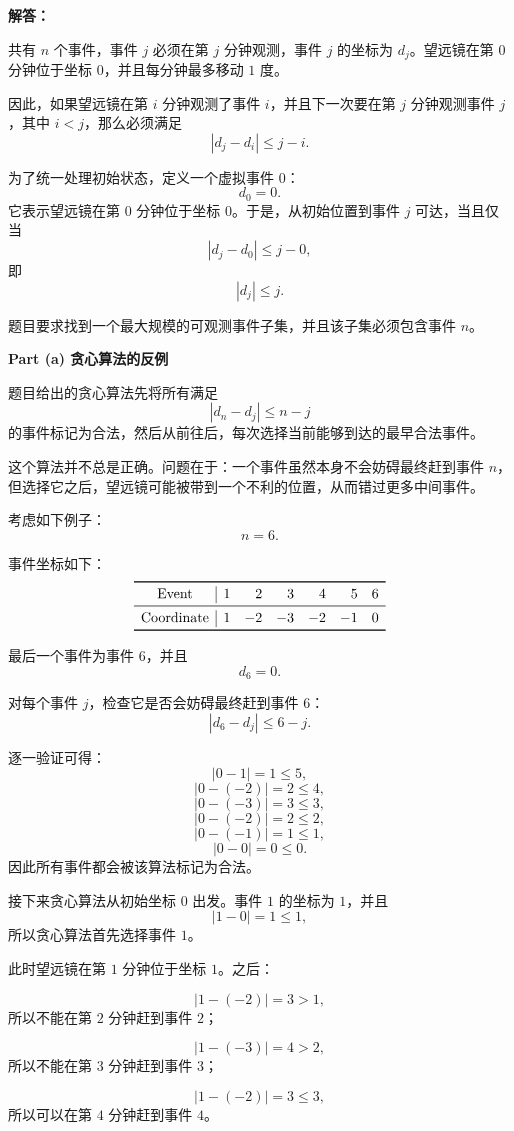 \documentclass[12pt,a4paper]{article}
\begin{document}
\begin{answerbox}
\textbf{解答：}

共有 $n$ 个事件，事件 $j$ 必须在第 $j$ 分钟观测，事件 $j$ 的坐标为 $d_j$。望远镜在第 $0$ 分钟位于坐标 $0$，并且每分钟最多移动 $1$ 度。

因此，如果望远镜在第 $i$ 分钟观测了事件 $i$，并且下一次要在第 $j$ 分钟观测事件 $j$，其中 $i<j$，那么必须满足
\[
|d_j-d_i|\le j-i.
\]

为了统一处理初始状态，定义一个虚拟事件 $0$：
\[
d_0=0.
\]
它表示望远镜在第 $0$ 分钟位于坐标 $0$。于是，从初始位置到事件 $j$ 可达，当且仅当
\[
|d_j-d_0|\le j-0,
\]
即
\[
|d_j|\le j.
\]

题目要求找到一个最大规模的可观测事件子集，并且该子集必须包含事件 $n$。

\textbf{Part (a) 贪心算法的反例}

题目给出的贪心算法先将所有满足
\[
|d_n-d_j|\le n-j
\]
的事件标记为合法，然后从前往后，每次选择当前能够到达的最早合法事件。

这个算法并不总是正确。问题在于：一个事件虽然本身不会妨碍最终赶到事件 $n$，但选择它之后，望远镜可能被带到一个不利的位置，从而错过更多中间事件。

考虑如下例子：
\[
n=6.
\]

事件坐标如下：
\[
\begin{array}{c|rrrrrr}
\toprule
\text{Event}      & 1 & 2 & 3 & 4 & 5 & 6\\
\midrule
\text{Coordinate} & 1 & -2 & -3 & -2 & -1 & 0\\
\bottomrule
\end{array}
\]

最后一个事件为事件 $6$，并且
\[
d_6=0.
\]

对每个事件 $j$，检查它是否会妨碍最终赶到事件 $6$：
\[
|d_6-d_j|\le 6-j.
\]

逐一验证可得：
\[
|0-1|=1\le 5,
\]
\[
|0-(-2)|=2\le 4,
\]
\[
|0-(-3)|=3\le 3,
\]
\[
|0-(-2)|=2\le 2,
\]
\[
|0-(-1)|=1\le 1,
\]
\[
|0-0|=0\le 0.
\]
因此所有事件都会被该算法标记为合法。

接下来贪心算法从初始坐标 $0$ 出发。事件 $1$ 的坐标为 $1$，并且
\[
|1-0|=1\le 1,
\]
所以贪心算法首先选择事件 $1$。

此时望远镜在第 $1$ 分钟位于坐标 $1$。之后：

\[
|1-(-2)|=3>1,
\]
所以不能在第 $2$ 分钟赶到事件 $2$；

\[
|1-(-3)|=4>2,
\]
所以不能在第 $3$ 分钟赶到事件 $3$；

\[
|1-(-2)|=3\le 3,
\]
所以可以在第 $4$ 分钟赶到事件 $4$。


\end{answerbox}
\end{document}
